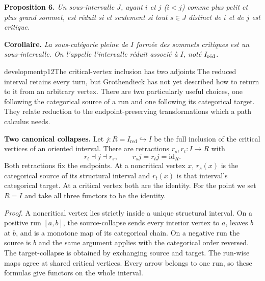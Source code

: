 
\textbf{Proposition 6.} \textit{Un sous-intervalle $J$, ayant $i$ et $j$ ($i < j$) comme plus petit et plus grand sommet, est réduit si et seulement si tout $s \in J$ distinct de $i$ et de $j$ est critique.}

\textbf{Corollaire.} \textit{La sous-catégorie pleine de $I$ formée des sommets critiques est un sous-intervalle. On l'appelle l'intervalle réduit associé à $I$, noté $I_{\textup{réd}}$.}



\begin{dcomment}{development}{p12}{The critical-vertex inclusion has two adjoints}
The reduced interval retains every turn, but Grothendieck has not yet described how to return to it from an arbitrary vertex. There are two particularly useful choices, one following the categorical source of a run and one following its categorical target. They relate reduction to the endpoint-preserving transformations which a path calculus needs.

\textbf{Two canonical collapses.}\ours{}
Let $j:R=I_{\mathrm{red}}\hookrightarrow I$ be the full inclusion of the critical vertices of an oriented interval. There are retractions $r_s,r_t:I\to R$ with
\[
 r_t\dashv j\dashv r_s,\qquad
 r_sj=r_tj=\mathrm{id}_R.
\]
Both retractions fix the endpoints. At a noncritical vertex $x$, $r_s(x)$ is the categorical source of its structural interval and $r_t(x)$ is that interval's categorical target. At a critical vertex both are the identity. For the point we set $R=I$ and take all three functors to be the identity.

\emph{Proof.} A noncritical vertex lies strictly inside a unique structural interval. On a positive run $[a,b]$, the source-collapse sends every interior vertex to $a$, leaves $b$ at $b$, and is a monotone map of its categorical chain. On a negative run the source is $b$ and the same argument applies with the categorical order reversed. The target-collapse is obtained by exchanging source and target. The run-wise maps agree at shared critical vertices. Every arrow belongs to one run, so these formulas give functors on the whole interval.


\end{dcomment}

